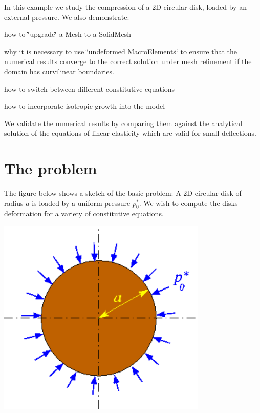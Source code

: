 In this example we study the compression of a 2D circular disk, loaded by an external pressure. We also demonstrate\+:
\begin{DoxyItemize}
\item how to \char`\"{}upgrade\char`\"{} a {\ttfamily Mesh} to a {\ttfamily Solid\+Mesh} 
\item why it is necessary to use \char`\"{}undeformed Macro\+Elements\char`\"{} to ensure that the numerical results converge to the correct solution under mesh refinement if the domain has curvilinear boundaries.
\item how to switch between different constitutive equations
\item how to incorporate isotropic growth into the model
\end{DoxyItemize}We validate the numerical results by comparing them against the analytical solution of the equations of linear elasticity which are valid for small deflections.



 

\hypertarget{index_problem}{}\section{The problem}\label{index_problem}
The figure below shows a sketch of the basic problem\+: A 2D circular disk of radius $ a $ is loaded by a uniform pressure $ p_0^*$. We wish to compute the disk\textquotesingle{}s deformation for a variety of constitutive equations.

 
\begin{DoxyImage}
\includegraphics[width=0.75\textwidth]{disk_compression}
\end{DoxyImage}


